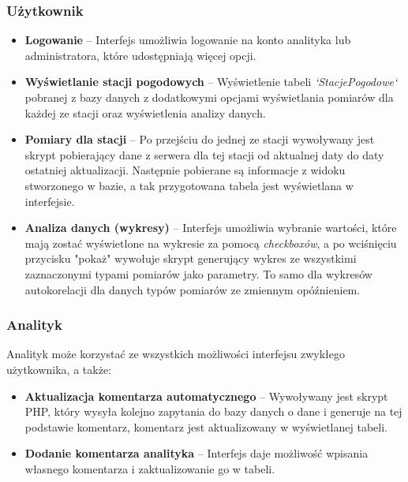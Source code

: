 \documentclass[12pt,a4paper]{article}
\begin{document}
\subsubsection{Użytkownik}
\begin{itemize}
\item \textbf{Logowanie} -- Interfejs umożliwia logowanie na konto analityka lub administratora, które udostępniają więcej opcji.
\item \textbf{Wyświetlanie stacji pogodowych} -- Wyświetlenie tabeli \textit{`StacjePogodowe`} pobranej z bazy danych z dodatkowymi opcjami wyświetlania pomiarów dla każdej ze stacji oraz wyświetlenia analizy danych.
\item \textbf{Pomiary dla stacji} -- Po przejściu do jednej ze stacji wywoływany jest skrypt pobierający dane z serwera dla tej stacji od aktualnej daty do daty ostatniej aktualizacji. Następnie pobierane są informacje z widoku stworzonego w bazie, a tak przygotowana tabela jest wyświetlana w interfejsie.
\item \textbf{Analiza danych (wykresy)} -- Interfejs umożliwia wybranie wartości, które mają zostać wyświetlone na wykresie za pomocą \textit{checkboxów}, a po wciśnięciu przycisku "pokaż" wywołuje skrypt generujący wykres ze wszystkimi zaznaczonymi typami pomiarów jako parametry. To samo dla wykresów autokorelacji dla danych typów pomiarów ze zmiennym opóźnieniem.
\end{itemize}
\subsubsection{Analityk}
Analityk może korzystać ze wszystkich możliwości interfejsu zwykłego użytkownika, a także:
\begin{itemize}
\item \textbf{Aktualizacja komentarza automatycznego} -- Wywoływany jest skrypt PHP, który wysyła kolejno zapytania do bazy danych o dane i generuje na tej podstawie komentarz, komentarz jest aktualizowany w wyświetlanej tabeli.
\item \textbf{Dodanie komentarza analityka} -- Interfejs daje możliwość wpisania własnego komentarza i zaktualizowanie go w tabeli.
\end{itemize}
\end{document}

